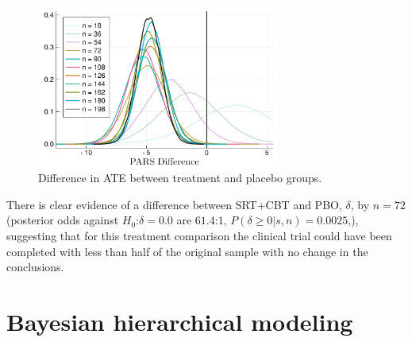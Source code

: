 \documentclass{juliacon}
\begin{document}
\begin{figure}[t]
	\centerline{\includegraphics[width=8cm]{sequential_plot.pdf}}
	\caption{Difference in ATE between treatment and placebo groups.} 
	\label{fig:pars_diff}
\end{figure}

\begin{table}
	\label{tab:seq}
\end{table}
\vskip 6pt
There is clear evidence of a difference between SRT+CBT and PBO, $\delta$, by $n=72$ (posterior odds against $H_0$:$\delta=0.0$ are $61.4$:$1$, $P(\delta \ge 0|s,n) = 0.0025$,), suggesting that for this treatment comparison the clinical trial could have been completed with less than half of the original sample with no change in the conclusions.

\section{Bayesian hierarchical modeling}
\label{sec:hbm}
\end{document}

